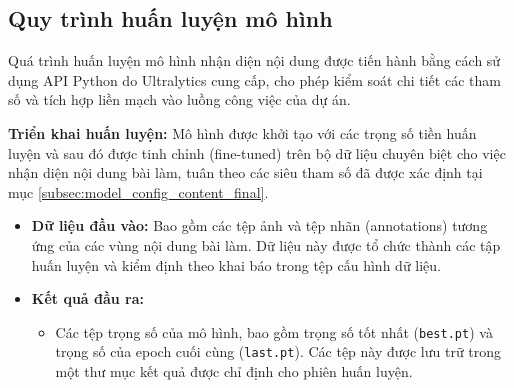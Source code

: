 \subsection{Quy trình huấn luyện mô hình}
\label{subsec:training_process_content_final}
Quá trình huấn luyện mô hình nhận diện nội dung được tiến hành bằng cách sử dụng API Python do Ultralytics cung cấp, cho phép kiểm soát chi tiết các tham số và tích hợp liền mạch vào luồng công việc của dự án.

\textbf{Triển khai huấn luyện:}
Mô hình được khởi tạo với các trọng số tiền huấn luyện và sau đó được tinh chỉnh (fine-tuned) trên bộ dữ liệu chuyên biệt cho việc nhận diện nội dung bài làm, tuân theo các siêu tham số đã được xác định tại mục \ref{subsec:model_config_content_final}.
\begin{itemize}
    \item \textbf{Dữ liệu đầu vào:} Bao gồm các tệp ảnh và tệp nhãn (annotations) tương ứng của các vùng nội dung bài làm. Dữ liệu này được tổ chức thành các tập huấn luyện và kiểm định theo khai báo trong tệp cấu hình dữ liệu.
    \item \textbf{Kết quả đầu ra:}
    \begin{itemize}
        \item Các tệp trọng số của mô hình, bao gồm trọng số tốt nhất (\texttt{best.pt}) và trọng số của epoch cuối cùng (\texttt{last.pt}). Các tệp này được lưu trữ trong một thư mục kết quả được chỉ định cho phiên huấn luyện.

    \end{itemize}
\end{itemize}



